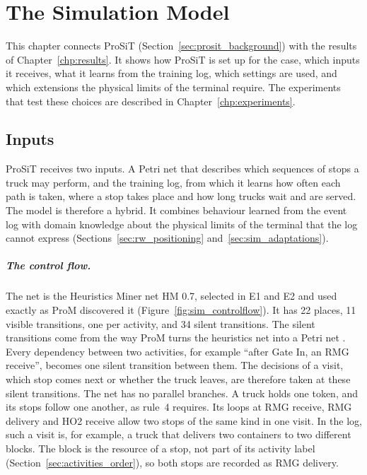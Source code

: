 \chapter{The Simulation Model}
\label{chp:process_discovery_methodology}

This chapter connects ProSiT (Section~\ref{sec:prosit_background}) with the
results of Chapter~\ref{chp:results}. It shows how ProSiT is set up for the case,
which inputs it receives, what it learns from the training log, which settings
are used, and which extensions the physical limits of the terminal require. The
experiments that test these choices are described in Chapter~\ref{chp:experiments}.

\section{Inputs}
\label{sec:sim_overview}
\label{sec:sim_controlflow}

ProSiT receives two inputs. A Petri net that describes which sequences of stops a
truck may perform, and the training log, from which it learns how often each path
is taken, where a stop takes place and how long trucks wait and are served. The
model is therefore a hybrid. It combines behaviour learned from the event log with
domain knowledge about the physical limits of the terminal that the log cannot
express (Sections~\ref{sec:rw_positioning} and~\ref{sec:sim_adaptations}).

\paragraph{The control flow.} The net is the Heuristics Miner net HM 0.7, selected
in E1 and E2 and used exactly as ProM discovered it (Figure~\ref{fig:sim_controlflow}).
It has 22 places, 11 visible transitions, one per activity, and 34 silent
transitions. The silent transitions come from the way ProM turns the heuristics net
into a Petri net \cite{Mannhardt2017iDHM}. Every dependency between two activities,
for example ``after Gate In, an RMG receive'', becomes one silent transition between
them. The decisions of
a visit, which stop comes next or whether the truck leaves, are therefore taken at
these silent transitions. The net has no parallel branches. A truck holds one token,
and its stops follow one another, as rule~4 requires. Its loops at RMG receive, RMG
delivery and HO2 receive allow two stops of the same kind in one visit. In the log,
such a visit is, for example, a truck that delivers two containers to two different
blocks. The block is the resource of a stop, not part of its activity label
(Section~\ref{sec:activities_order}), so both stops are recorded as RMG delivery.

